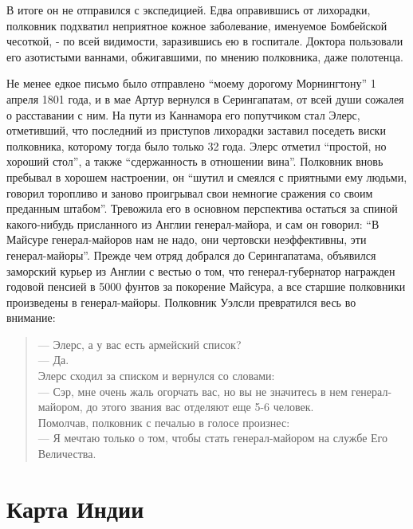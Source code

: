 \documentclass[
  oneside,
  12pt,
  titlepage]{book}
\begin{document}
В итоге он не отправился с экспедицией. Едва оправившись от лихорадки, полковник подхватил неприятное кожное заболевание, именуемое Бомбейской чесоткой, - по всей видимости, заразившись ею в госпитале. Доктора пользовали его азотистыми ваннами, обжигавшими, по мнению полковника, даже полотенца.

Не менее едкое письмо было отправлено ``моему дорогому Морнингтону'' 1 апреля 1801 года, и в мае Артур вернулся в Серингапатам, от всей души сожалея о расставании с ним. На пути из Каннамора его попутчиком стал Элерс, отметивший, что последний из приступов лихорадки заставил поседеть виски полковника, которому тогда было только 32 года. Элерс отметил ``простой, но хороший стол'', а также ``сдержанность в отношении вина''. Полковник вновь пребывал в хорошем настроении, он ``шутил и смеялся с приятными ему людьми, говорил торопливо и заново проигрывал свои немногие сражения со своим преданным штабом''. Тревожила его в основном перспектива остаться за спиной какого-нибудь присланного из Англии генерал-майора, и сам он говорил: ``В Майсуре генерал-майоров нам не надо, они чертовски неэффективны, эти генерал-майоры''. Прежде чем отряд добрался до Серингапатама, объявился заморский курьер из Англии с вестью о том, что генерал-губернатор награжден годовой пенсией в 5000 фунтов за покорение Майсура, а все старшие полковники произведены в генерал-майоры. Полковник Уэлсли превратился весь во внимание:

\begin{quote}
--- Элерс, а у вас есть армейский список?\\
--- Да.\\
Элерс сходил за списком и вернулся со словами:\\
--- Сэр, мне очень жаль огорчать вас, но вы не значитесь в нем генерал-майором, до этого звания вас отделяют еще 5-6 человек.\\
Помолчав, полковник с печалью в голосе произнес:\\
--- Я мечтаю только о том, чтобы стать генерал-майором на службе Его Величества.
\end{quote}

\hypertarget{appendix-ux43fux440ux438ux43bux43eux436ux435ux43dux438ux44f}{%
\appendix}


\hypertarget{ux43aux430ux440ux442ux430-ux438ux43dux434ux438ux438}{%
\chapter{Карта Индии}\label{ux43aux430ux440ux442ux430-ux438ux43dux434ux438ux438}}
\end{document}
